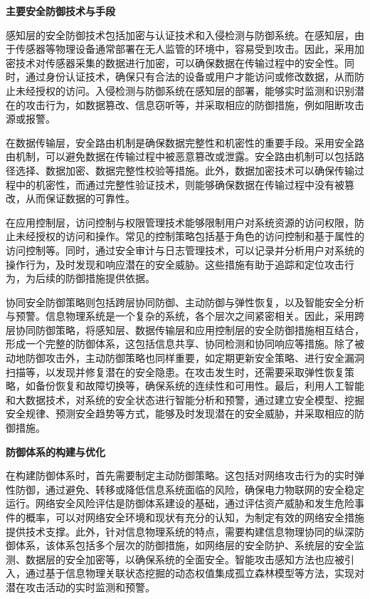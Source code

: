 \textbf{主要安全防御技术与手段}

感知层的安全防御技术包括加密与认证技术和入侵检测与防御系统。在感知层，由于传感器等物理设备通常部署在无人监管的环境中，容易受到攻击。因此，采用加密技术对传感器采集的数据进行加密，可以确保数据在传输过程中的安全性。同时，通过身份认证技术，确保只有合法的设备或用户才能访问或修改数据，从而防止未经授权的访问。入侵检测与防御系统在感知层的部署，能够实时监测和识别潜在的攻击行为，如数据篡改、信息窃听等，并采取相应的防御措施，例如阻断攻击源或报警。

在数据传输层，安全路由机制是确保数据完整性和机密性的重要手段。采用安全路由机制，可以避免数据在传输过程中被恶意篡改或泄露。安全路由机制可以包括路径选择、数据加密、数据完整性校验等措施。此外，数据加密技术可以确保传输过程中的机密性，而通过完整性验证技术，则能够确保数据在传输过程中没有被篡改，从而保证数据的可靠性。

在应用控制层，访问控制与权限管理技术能够限制用户对系统资源的访问权限，防止未经授权的访问和操作。常见的控制策略包括基于角色的访问控制和基于属性的访问控制等。同时，通过安全审计与日志管理技术，可以记录并分析用户对系统的操作行为，及时发现和响应潜在的安全威胁。这些措施有助于追踪和定位攻击行为，为后续的防御措施提供依据。

协同安全防御策略则包括跨层协同防御、主动防御与弹性恢复，以及智能安全分析与预警。信息物理系统是一个复杂的系统，各个层次之间紧密相关。因此，采用跨层协同防御策略，将感知层、数据传输层和应用控制层的安全防御措施相互结合，形成一个完整的防御体系，这包括信息共享、协同检测和协同响应等措施。除了被动地防御攻击外，主动防御策略也同样重要，如定期更新安全策略、进行安全漏洞扫描等，以发现并修复潜在的安全隐患。在攻击发生时，还需要采取弹性恢复策略，如备份恢复和故障切换等，确保系统的连续性和可用性。最后，利用人工智能和大数据技术，对系统的安全状态进行智能分析和预警，通过建立安全模型、挖掘安全规律、预测安全趋势等方式，能够及时发现潜在的安全威胁，并采取相应的防御措施。

\textbf{防御体系的构建与优化}

在构建防御体系时，首先需要制定主动防御策略。这包括对网络攻击行为的实时弹性防御，通过避免、转移或降低信息系统面临的风险，确保电力物联网的安全稳定运行。网络安全风险评估是防御体系建设的基础，通过评估资产威胁和发生危险事件的概率，可以对网络安全环境和现状有充分的认知，为制定有效的网络安全措施提供技术支撑。此外，针对信息物理系统的特点，需要构建信息物理协同的纵深防御体系，该体系包括多个层次的防御措施，如网络层的安全防护、系统层的安全监测、数据层的安全加密等，以确保系统的全面安全。智能攻击感知方法也应被引入，通过基于信息物理关联状态挖掘的动态权值集成孤立森林模型等方法，实现对潜在攻击活动的实时监测和预警。

